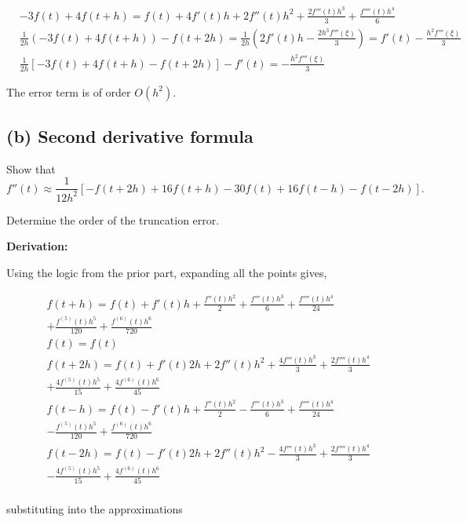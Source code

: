 \documentclass[11pt]{article}
\begin{document}
\[
\begin{aligned}
  &-3f(t) + 4f(t+h) = f(t) + 4f'(t)h + 2f''(t)h^2 + \frac{2f'''(t)h^3}{3} + \frac{f''''(t)h^4}{6}\\
  &\frac{1}{2h}(-3f(t) + 4f(t+h)) - f(t+2h) = \frac{1}{2h}(2f'(t)h - \frac{2h^3f'''(\xi)}{3})=f'(t) - \frac{h^2f'''(\xi)}{3}\\
  &\frac{1}{2h}[-3f(t) + 4f(t+h) - f(t+2h)] -f'(t) = -\frac{h^2f'''(\xi)}{3} 
\end{aligned}
\]

\noindent The error term is of order $O(h^2)$.

\subsection*{(b) Second derivative formula}

Show that
\[
f''(t)\approx
\frac{1}{12h^2}
\left[
-f(t+2h)+16f(t+h)-30f(t)+16f(t-h)-f(t-2h)
\right].
\]

Determine the order of the truncation error.

\bigskip

\noindent\textbf{Derivation:}

\noindent Using the logic from the prior part, expanding all the points gives,

\[
\begin{aligned}
  &f(t+h) = f(t) + f'(t)h + \frac{f''(t)h^2}{2} + \frac{f'''(t)h^3}{6} + \frac{f''''(t)h^4}{24} \\
  &+ \frac{f^{(5)}(t)h^5}{120} + \frac{f^{(6)}(t)h^6}{720}\\
  &f(t) = f(t)\\
  &f(t+2h) = f(t) + f'(t)2h + 2f''(t)h^2 + \frac{4f'''(t)h^3}{3} + \frac{2f''''(t)h^4}{3} \\
  &+ \frac{4f^{(5)}(t)h^5}{15} + \frac{4f^{(6)}(t)h^6}{45}\\
  &f(t-h) = f(t) - f'(t)h + \frac{f''(t)h^2}{2} - \frac{f'''(t)h^3}{6} + \frac{f''''(t)h^4}{24}\\
  &- \frac{f^{(5)}(t)h^5}{120} + \frac{f^{(6)}(t)h^6}{720}\\
  &f(t-2h) = f(t) - f'(t)2h + 2f''(t)h^2 - \frac{4f'''(t)h^3}{3} + \frac{2f''''(t)h^4}{3}\\
  &- \frac{4f^{(5)}(t)h^5}{15} + \frac{4f^{(6)}(t)h^6}{45}\\
\end{aligned}
\]

\noindent substituting into the approximations
\end{document}
